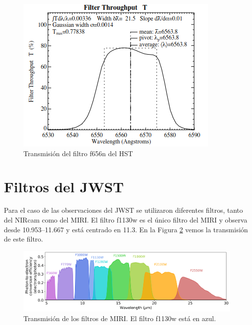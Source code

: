 \documentclass{book}
\begin{document}
\begin{figure}
    \centering
    \includegraphics[width=\textwidth]{Appendices/f656n_filter.png}
    \caption{Transmisión del filtro f656n del HST}
    \label{fig:filtro f656n}
\end{figure}

\section{Filtros del JWST}\label{AP S:JWST}

Para el caso de las observaciones del JWST se utilizaron diferentes
filtros, tanto del NIRcam como del MIRI. El filtro f1130w es el único
filtro del MIRI y observa desde 10.953--\SI{11.667}{\mum} y está
centrado en \SI{11.3}{\mum}. En la Figura \ref{fig:filtos MIRI} vemos
la transmisión de este filtro.

\begin{figure}
    \centering
    \includegraphics[width=\textwidth]{Appendices/miri_img_pces_ETC4.0.png}
    \caption{Transmisión de los filtros de MIRI. El filtro f1130w está en azul.}
    \label{fig:filtos MIRI}
\end{figure}
\end{document}
